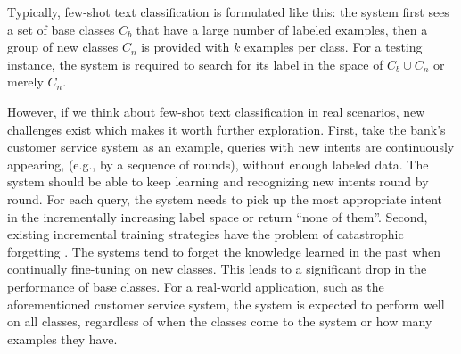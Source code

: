 \documentclass[11pt]{article}
\begin{document}
Typically, few-shot text classification is formulated like this: the system first sees a set of base classes $C_b$ that have a large number of labeled examples,
then a group of new classes $C_n$ is provided with $k$ examples per class.
For a testing instance, the system is required to search for its label in the space of $C_b\cup C_n$ or merely $C_n$.

However, if we think about few-shot text classification in real scenarios, new challenges exist which makes it worth further exploration.
First, take the bank's customer service system as an example, queries with new intents are continuously appearing, (e.g., by a sequence of rounds), without enough labeled data. The system should be able to keep learning and recognizing new intents round by round.
For each query, the system needs to pick up the most appropriate intent in the incrementally increasing label space or return ``none of them''.
Second, existing incremental training strategies have the problem of catastrophic forgetting \cite{mccloskey1989catastrophic}. The systems tend to forget the knowledge learned in the past when continually fine-tuning on new classes. This leads to a significant drop in the performance of base classes. For a real-world application, such as the aforementioned customer service system, the system is expected to perform well on all classes, regardless of when the classes come to the system or how many examples they have.
\end{document}
